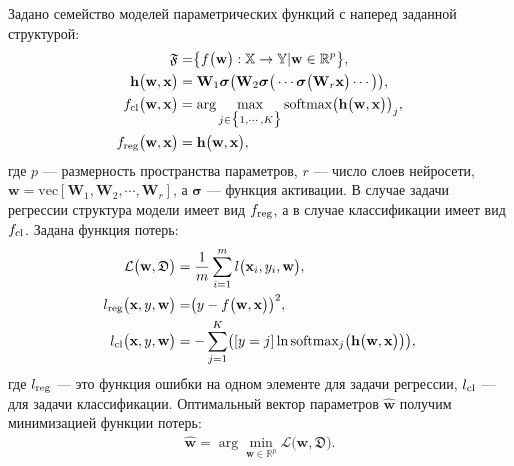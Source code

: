 Задано семейство моделей параметрических функций с наперед заданной структурой:
\[
\label{eq:st:2}
\begin{aligned}
\mathfrak{F} &= \bigr\{f\bigr(\textbf{w}\bigr):\mathbb{X} \to \mathbb{Y} | \textbf{w} \in \mathbb{R}^{p}\bigr\}, \\ 
\mathbf{h}\bigr(\textbf{w}, \textbf{x}\bigr) &= \textbf{W}_1\bm{\sigma}\bigr(\textbf{W}_2\bm{\sigma}\bigr(\cdots\bm{\sigma}\bigr(\textbf{W}_r\textbf{x}\bigr)\cdots\bigr)\bigr),\\
f_{\text{\text{cl}}}\bigr(\textbf{w}, \textbf{x}\bigr) &= \arg \max_{j \in \bigr\{1,\cdots, K\bigr\}} \text{softmax}\bigr(\mathbf{h}\bigr(\textbf{w}, \textbf{x}\bigr)\bigr)_{j}, \\ 
f_{\text{reg}}\bigr(\textbf{w}, \textbf{x}\bigr) & = \mathbf{h}\bigr(\textbf{w}, \textbf{x}\bigr), 
\end{aligned}
\]
где $p$ --- размерность пространства параметров, $r$ --- число слоев нейросети, $\textbf{w} = \text{vec}[\textbf{W}_1, \textbf{W}_2, \cdots, \textbf{W}_r]$, а $\bm{\sigma}$ --- функция активации. В случае задачи регрессии структура модели имеет вид $f_{\text{\text{reg}}}$, а в случае классификации имеет вид $f_{\text{\text{cl}}}$.
Задана функция потерь:
\[
\label{eq:st:3}
\begin{aligned}
\mathcal{L}\bigr(\textbf{w}, \mathfrak{D}\bigr) &= \frac{1}{m}\sum_{i=1}^{m}l\bigr(\textbf{x}_{i}, y_i, \textbf{w}\bigr),\\
l_{\text{\text{reg}}}\bigr(\textbf{x}, y, \textbf{w}\bigr) &= \bigr(y - f\bigr(\textbf{w}, \textbf{x}\bigr)\bigr)^{2},\\
l_{\text{\text{cl}}}\bigr(\textbf{x}, y, \textbf{w}\bigr) &= -\sum_{j=1}^{K}\bigr([y = j]\ln\text{softmax}_j\bigr(\mathbf{h}\bigr(\textbf{w}, \textbf{x}\bigr)\bigr)\bigr),
\end{aligned}
\]
где $l_{\text{\text{reg}}}$ --- это функция ошибки на одном элементе для задачи регрессии, $l_{\text{\text{cl}}}$ --- для задачи классификации.
Оптимальный вектор параметров $\hat{\textbf{w}}$ получим минимизацией функции потерь:
\[
\label{eq:st:0:1}
\begin{aligned}
\hat{\textbf{w}} = \arg \min_{\textbf{w}\in\mathbb{R}^{p}} \mathcal{L}\bigr(\textbf{w}, \mathfrak{D}\bigr).
\end{aligned}
\]

